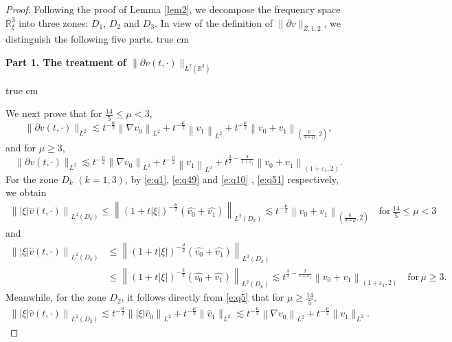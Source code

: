 \documentclass[11pt,twoside]{article}
\newcommand{\R}{\mathbb R}
\newcommand{\p}{\partial}
\newcommand{\f}{\frac}
\theoremstyle{plain}
\theoremstyle{definition}
\theoremstyle{remark}
\numberwithin{equation}{section}
\begin{document}
\begin{proof}
Following the proof of Lemma \ref{lem2}, we decompose the frequency space $\mathbb{R}_{\xi}^{3}$ into three zones: 
$D_1$, $D_2$ and $D_3$.
In view of the definition of $\|\p v\|_{Z, 1, 2}$, we distinguish  the following five parts.
 true cm

{\bf Part 1.  The treatment  of $\|\p v(t, \cdot)\|_{L^2(\R^3)}$ }

 true cm

We next prove that for $\f{14}{5}\leq\mu<3$,
\begin{equation}\label{e:q72'}
\|\p v(t, \cdot)\|_{L^2} \lesssim t^{-\f{\mu}{2}}\left\|\nabla v_0\right\|_{L^ 2}+t^{-\f{\mu}{2}}\left\| v_1\right\|_{L^ 2}+t^{-\f{\mu}{2}}\left\|v_0+v_1\right\|_{(\f{6}{3+\mu},2)},
\end{equation}
and for $\mu\geq3$,
\begin{equation}\label{e:q72}
\|\p v(t, \cdot)\|_{L^2} \lesssim t^{-\f{\mu}{2}}\left\|\nabla v_0\right\|_{L^ 2}+t^{-\f{\mu}{2}}\left\| v_1\right\|_{L^ 2}+t^{\f32-\f{3}{1+\varepsilon_1}}\left\|v_0+v_1\right\|_{(1+\varepsilon_1,2)}.
\end{equation}
For the zone $D_k$ $(k=1,3)$, by  \eqref{e:q1}, \eqref{e:q49} and \eqref{e:q10} , \eqref{e:q51} respectively, we obtain
\begin{equation}\label{e:q73'}
\begin{aligned}
\left\||\xi|\hat{v}(t, \cdot)\right\|_{L^2(D_k)}\leq\left\|(1+t|\xi|)^{-\f{\mu}{2}}(\hat{v_0}+\hat{v_1})\right\|_{L^2(D_k)}\lesssim t^{-\f{\mu}{2}}\left\|v_0+v_1\right\|_{(\f{6}{3+\mu},2)}\quad \text{for}\, \f{14}{5}\leq\mu<3
\end{aligned}
\end{equation}
and
\begin{equation}\label{e:q73}
\begin{aligned}
\left\||\xi|\hat{v}(t, \cdot)\right\|_{L^2(D_k)}&\leq\left\|(1+t|\xi|)^{-\f{\mu}{2}}(\hat{v_0}+\hat{v_1})\right\|_{L^2(D_k)}\\
&\leq\left\|(1+t|\xi|)^{-\f32}(\hat{v_0}+\hat{v_1})\right\|_{L^2(D_k)}\lesssim t^{\f32-\f{3}{1+\varepsilon_1}}\left\|v_0+v_1\right\|_{(1+\varepsilon_1,2)}\quad \text{for}\, \mu \geq3.
\end{aligned}
\end{equation}
Meanwhile, for the zone $D_2$, it follows directly from \eqref{e:q5} that for $\mu\geq\f{14}{5}$,
$$
\begin{aligned}
\left\||\xi|\hat{v}(t, \cdot)\right\|_{L^2(D_2)}\lesssim t^{-\frac{\mu}{2}}\left\||\xi|\hat{v}_{0}\right\|_{L^{2}}+t^{-\f{\mu}{2}} \|\hat{v}_{1}\|_{L^{2}}\lesssim t^{-\frac{\mu}{2}}\left\|\nabla v_{0}\right\|_{L^{2}}+ t^{-\f{\mu}{2}}\|v_1\|_{L^{2}}.

\end{aligned}$$
\end{proof}
\end{document}
